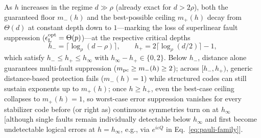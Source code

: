 \documentclass[aps,prl,reprint,notitlepage,nofootinbib,nobibnotes]{revtex4-2}
\begin{document}
As \(h\) increases in the regime \(d\gg\rho\) (already exact for \(d>2\rho\)), both the guaranteed floor \(m_-(h)\) and the best-possible ceiling \(m_+(h)\) decay from \(\Theta(d)\) at constant depth down to \(1\)---marking the loss of superlinear fault suppression (\(\epsilon_{\rm L}^{\rm opt}=\Theta(p)\))---at the respective critical depths
\begin{equation}\label{eq:discussion-exponent-depths}
 h_- = \lceil\log_\rho(d-\rho)\rceil,\qquad
 h_+ = 2\lceil\log_\rho(d/2)\rceil-1,
\end{equation}
which satisfy \(h_-\le h_+\le h_\infty\) with \(h_\infty-h_+\in\{0,2\}\). Below \(h_-\), distance alone guarantees multi-fault suppression (\(m_{\rm pc}\ge m_-(h)\ge2\)); across \([h_-,h_+)\), generic distance-based protection fails (\(m_-(h)=1\)) while structured codes can still sustain exponents up to \(m_+(h)\); once \(h\ge h_+\), even the best-case ceiling collapses to \(m_+(h)=1\), so worst-case error suppression vanishes for every stabilizer code before (or right as) continuous symmetries turn on at \(h_\infty\) [although single faults remain individually detectable below \(h_\infty\) and first become undetectable logical errors at \(h=h_\infty\), e.g., via \(e^{i\varepsilon Q}\) in Eq.~\eqref{eq:pauli-family}].
\end{document}
